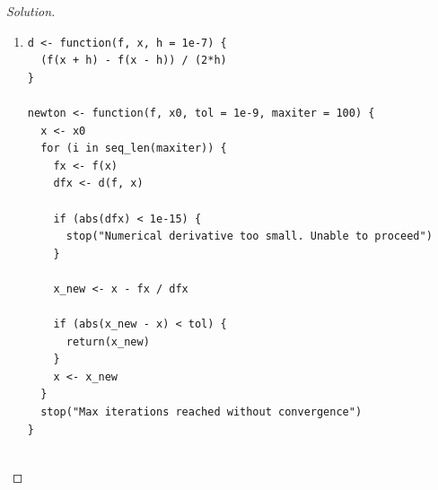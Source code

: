 \documentclass{article}
\newenvironment{solution}
  {\renewcommand\qedsymbol{$\blacksquare$}\begin{proof}[Solution]$ $}
  {\end{proof}}
\let \extra T
\begin{document}
\begin{Exercise}
\begin{solution}
\begin{enumerate}[label=(\roman*)]
                  \begin{align*}
                      l(\alpha, \beta| x_1,x_2,\ldots,x_n) & =
                      -n\log(\Gamma(\alpha))
                      -n\cdot a(\log(\bar x) - \log(\alpha))
                      + (\alpha-1)\sum_{i=1}^{n}\log(x_i)-
                      \frac{a}{\bar x}\sum_{i=1}^{n}x_i        \\
                                                           & =
                      -n\log(\Gamma(\alpha))
                      -na\log(\bar x) +na\log(\alpha)
                      + \alpha\sum_{i=1}^{n}\log(x_i) - \sum_{i=1}^{n}\log(x_i)
                      - an
                  \end{align*}
                  Note that we define \(\psi(\alpha) = \frac{\Gamma'(\alpha)}{\Gamma(\alpha)}\)
                  \begin{align*}
                      \frac{\partial}{\partial \alpha} l(\alpha, \beta| x_1,x_2,\ldots,x_n)
                                   & = -n\frac{1}{\Gamma(\alpha)}\Gamma(\alpha)\psi(\alpha) + - n\log(\bar x) + n(\log(\alpha)+1) + \sum_{i=1}^{n}\log(x_i) - n \\
                                   & = -n\psi(\alpha) + - n\log(\bar x) + n\log(\alpha) + \sum_{i=1}^{n}\log(x_i)                                               \\
                      \psi(\alpha) & = - \log(\bar x) + \log(\alpha) + \frac{1}{n}\sum_{i=1}^{n}\log(x_i)                                                       \\
                  \end{align*}
                  \ifx \extra T
            \item
                  \begin{verbatim}
d <- function(f, x, h = 1e-7) {
  (f(x + h) - f(x - h)) / (2*h)
}

newton <- function(f, x0, tol = 1e-9, maxiter = 100) {
  x <- x0
  for (i in seq_len(maxiter)) {
    fx <- f(x)
    dfx <- d(f, x)
    
    if (abs(dfx) < 1e-15) {
      stop("Numerical derivative too small. Unable to proceed")
    }
    
    x_new <- x - fx / dfx
    
    if (abs(x_new - x) < tol) {
      return(x_new)
    }
    x <- x_new
  }
  stop("Max iterations reached without convergence")
}


\end{verbatim}
\end{enumerate}
\end{solution}
\end{Exercise}
\end{document}
